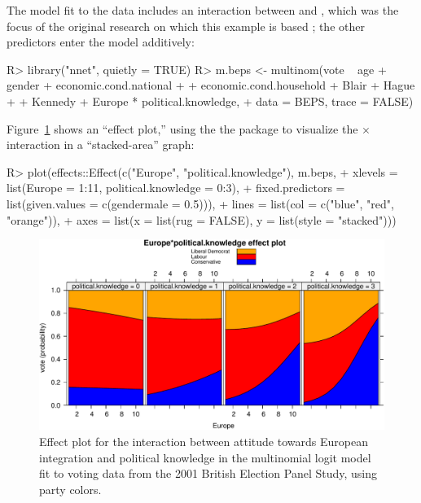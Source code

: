 \documentclass[
]{jss}
\begin{document}
The model fit to the data includes an interaction between 
and , which was the focus of the original
research on which this example is based
\citep{AndersenHeathSinnott:2002}; the other predictors enter the model
additively:

\begin{CodeChunk}
\begin{CodeInput}
R> library("nnet", quietly = TRUE)
R> m.beps <- multinom(vote ~ age + gender + economic.cond.national
+                         + economic.cond.household + Blair + Hague
+                         + Kennedy + Europe * political.knowledge,
+                    data = BEPS, trace = FALSE)
\end{CodeInput}
\end{CodeChunk}

Figure~\ref{fig:BEPS-plot} shows an ``effect plot,'' using the the
 package \citep{FoxWeisberg:2019} to visualize the
 \(\times\)  interaction in a
``stacked-area'' graph:

\begin{CodeChunk}
\begin{CodeInput}
R> plot(effects::Effect(c("Europe", "political.knowledge"), m.beps,
+             xlevels = list(Europe = 1:11, political.knowledge = 0:3),
+             fixed.predictors = list(given.values = c(gendermale = 0.5))),
+      lines = list(col = c("blue", "red", "orange")),
+      axes = list(x = list(rug = FALSE), y = list(style = "stacked")))
\end{CodeInput}
\begin{figure}

{\centering \includegraphics{Figures/BEPS-plot-1}

}

\caption[Effect plot for the interaction between attitude towards European integration and political knowledge in the multinomial logit model fit to voting data from the 2001 British Election Panel Study, using party colors]{Effect plot for the interaction between attitude towards European integration and political knowledge in the multinomial logit model fit to voting data from the 2001 British Election Panel Study, using party colors.}\label{fig:BEPS-plot}
\end{figure}
\end{CodeChunk}
\end{document}

